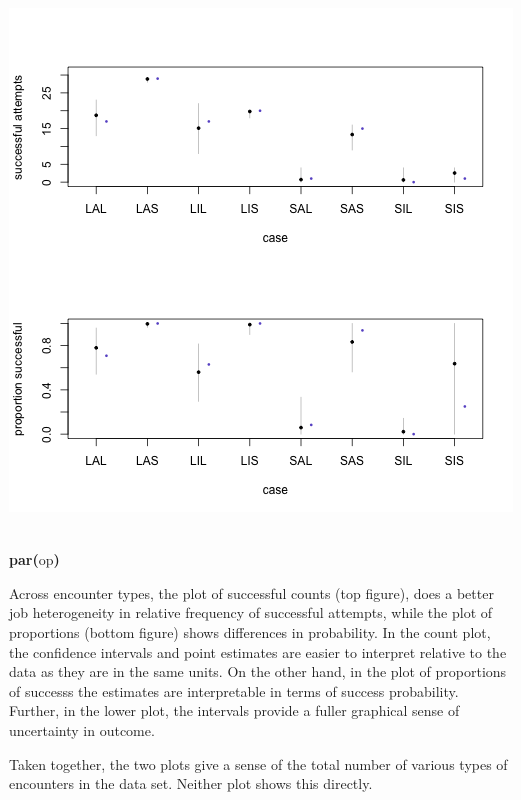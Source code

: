 \documentclass{article}
\makeatletter
\newcommand{\hlfunctioncall}[1]{\textcolor[rgb]{.5,0,.33}{\textbf{#1}}}%
\newcommand{\hlkeyword}[1]{\textbf{#1}}%
\newcommand{\hlsymbol}[1]{#1}%
\newcommand{\hlstd}[1]{\textcolor[rgb]{0,0,0}{#1}}%
\newenvironment{kframe}{%
 \def\FrameCommand##1{\hskip\@totalleftmargin \hskip-\fboxsep
 \colorbox{shadecolor}{##1}\hskip-\fboxsep
     \hskip-\linewidth \hskip-\@totalleftmargin \hskip\columnwidth}%
 \MakeFramed {\advance\hsize-\width
   \@totalleftmargin\z@ \linewidth\hsize
   \@setminipage}}%
 {\par\unskip\endMakeFramed}
\newenvironment{knitrout}{}{} %
\makeatother
\begin{document}
\begin{knitrout}
{\begin{kframe}
\begin{flushleft}
\normalfont
\end{flushleft}
\includegraphics{pirate-plot-b1} \begin{flushleft}
\ttfamily\noindent
\hspace*{\fill}\\
\hlstd{}\hlfunctioncall{par}\hlkeyword{(}\hlsymbol{op}\hlkeyword{)}\mbox{}
\normalfont
\end{flushleft}
\end{kframe}}
\end{knitrout}


Across encounter types, the plot of successful counts (top figure), does a better job heterogeneity in relative frequency of successful attempts, while the plot of proportions (bottom figure) shows differences in probability.
In the count plot, the confidence intervals and point estimates are easier to interpret relative to the data as they are in the same units.
On the other hand, in the plot of proportions of successs the estimates are interpretable in terms of success probability. 
Further, in the lower plot, the intervals provide a fuller graphical sense of uncertainty in outcome.

Taken together, the two plots give a sense of the total number of various types of encounters in the data set. 
Neither plot shows this directly. 
\end{document}
